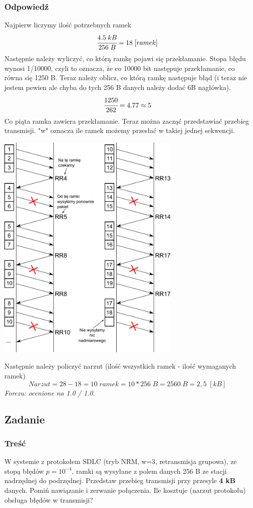 		\subsubsection{Odpowiedź}
			Najpierw liczymy ilość potrzebnych ramek
			$$ \cfrac{4.5\;kB}{256\;B}=18\;[ramek] $$
			Następnie należy wyliczyć, co którą ramkę pojawi się przekłamanie. Stopa błędu wynosi 1/10000, czyli to oznacza, że co 10000 bit następuje przekłamanie, co równa się 1250 B. Teraz należy oblicz, co którą ramkę następuje błąd (i teraz nie jestem pewien ale chyba do tych 256 B danych należy dodać 6B nagłówka).
			$$ \cfrac{1250}{262}={4.77}\approx5 $$
			Co piąta ramka zawiera przekłamanie. Teraz można zacząć przedstawiać przebieg transmisji. "w" oznacza ile ramek możemy przesłać w takiej jednej sekwencji.
			\begin{center}
				\includegraphics[width=9.0cm]{./images/zadanie09.pdf}
			\end{center}
			Następnie należy policzyć narzut (ilość wszystkich ramek - ilość wymaganych ramek)\\
			$$ Narzut = 28 - 18  = 10\;ramek = 10 * 256\;B = 2560\;B =2,5\; [kB] $$
			\small{ \emph{Forczu: ocenione na 1.0 / 1.0}}.

\newpage
	\subsection{Zadanie}
		\subsubsection{Treść}
			W systemie z protokołem SDLC (tryb NRM, w=3, retransmisja grupowa), ze stopą błędów $ p=10^{-4} $, ramki są wysyłane z polem danych 256 B ze stacji nadrzędnej do podrzędnej. Przedstaw przebieg transmisji przy przesyle \textbf{4 kB} danych. Pomiń nawiązanie i zerwanie połączenia. Ile kosztuje (narzut protokołu) obsługa błędów w transmisji?
